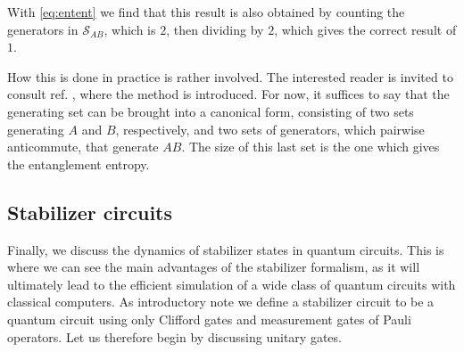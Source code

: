 With \cref{eq:entent} we find that this result is also obtained by counting the
generators in $\mathcal{S}_{AB}$, which is $2$, then dividing by $2$, which
gives the correct result of $1$. 

How this is done in practice is rather involved. The interested reader is
invited to consult ref. \cite{fattalEntanglementStabilizerFormalism2004}, where
the method is introduced. For now, it suffices to say that the generating set
can be brought into a canonical form, consisting of two sets generating $A$ and
$B$, respectively, and two sets of generators, which pairwise anticommute, that
generate $AB$. The size of this last set is the one which gives the
entanglement entropy.

\subsection{Stabilizer circuits}

Finally, we discuss the dynamics of stabilizer states in quantum circuits. This
is where we can see the main advantages of the stabilizer formalism, as it will
ultimately lead to the efficient simulation of a wide class of quantum circuits
with classical computers. 
As introductory note we define a stabilizer circuit to be a quantum
circuit using only Clifford gates and measurement gates of Pauli operators. Let
us therefore begin by discussing unitary gates.

